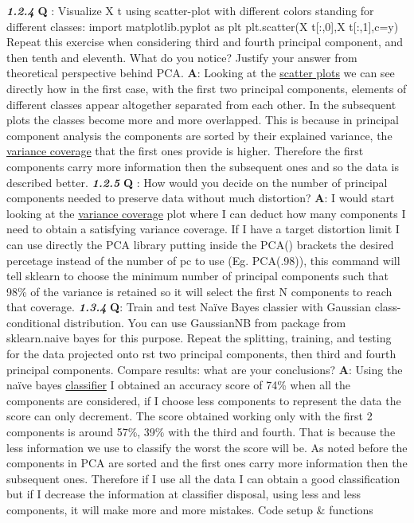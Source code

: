 \documentclass[11pt]{article}
\begin{document}
\textbf{\emph{1.2.4}} \textbf{Q} : Visualize X t using scatter-plot with
different colors standing for different classes: import
matplotlib.pyplot as plt plt.scatter(X t{[}:,0{]},X t{[}:,1{]},c=y)
Repeat this exercise when considering third and fourth principal
component, and then tenth and eleventh. What do you notice? Justify your
answer from theoretical perspective behind PCA.\newline
\textbf{A}: Looking at the \hyperlink{scatter}{scatter plots} we can see directly how
in the first case, with the first two principal components, elements of
different classes appear altogether separated from each other. In the
subsequent plots the classes become more and more overlapped. This is
because in principal component analysis the components are sorted by
their explained variance, the \hyperlink{varianceCoverage}{variance coverage} that the
first ones provide is higher. Therefore the first components carry more
information then the subsequent ones and so the data is described
better.\newline
\textbf{\emph{1.2.5}} \textbf{Q} : How would you decide on the number of
principal components needed to preserve data without much distortion?\newline
\textbf{A}: I would start looking at the \hyperlink{varianceCoverage}{variance coverage}
plot where I can deduct how many components I need to obtain a
satisfying variance coverage. If I have a target distortion limit I can
use directly the PCA library putting inside the PCA() brackets the
desired percetage instead of the number of pc to use (Eg. PCA(.98)),
this command will tell sklearn to choose the minimum number of principal
components such that 98\% of the variance is retained so it will select
the first N components to reach that coverage.\newline
\textbf{\emph{1.3.4}} \textbf{Q}: Train and test Naïve Bayes classier
with Gaussian class-conditional distribution. You can use GaussianNB
from package from sklearn.naive bayes for this purpose. Repeat the
splitting, training, and testing for the data projected onto rst two
principal components, then third and fourth principal components.
Compare results: what are your conclusions?\newline
\textbf{A}: Using the naïve bayes \hyperlink{classifier}{classifier} I obtained an
accuracy score of 74\% when all the components are considered, if I
choose less components to represent the data the score can only
decrement. The score obtained working only with the first 2 components
is around 57\%, 39\% with the third and fourth. That is because the less
information we use to classify the worst the score will be. As noted
before the components in PCA are sorted and the first ones carry more
information then the subsequent ones. Therefore if I use all the data I
can obtain a good classification but if I decrease the information at
classifier disposal, using less and less components, it will make more
and more mistakes.
\newpage
    \hypertarget{definitions}{Code setup \& functions}
\end{document}
